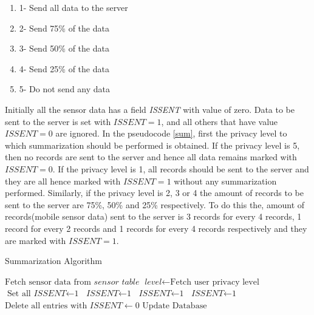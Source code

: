 \begin{enumerate}
	\item 1- Send all data to the server
	\item 2- Send 75\% of the data
    \item 3- Send 50\% of the data
    \item 4- Send 25\% of the data
    \item 5- Do not send any data
\end{enumerate}

Initially all the sensor data has a field \textit{ISSENT} with value of zero. Data to be sent to the server is set with $\textit{ISSENT}=1$, and all others that have value $\textit{ISSENT}=0$ are ignored. In the pseudocode \ref{sum}, first the privacy level to which summarization should be performed is obtained. If the privacy level is 5, then no records are sent to the server and hence all data remains marked with $\textit{ISSENT}=0$. If the privacy level is 1, all records should be sent to the server and they are all hence marked with $\textit{ISSENT}=1$ without any summarization performed. Similarly, if the privacy level is 2, 3 or 4 the amount of records to be sent to the server are 75\%, 50\% and 25\% respectively. To do this the, amount of records(mobile sensor data) sent to the server is 3 records for every 4 records, 1 record for every 2 records and 1 records for every 4 records respectively and they are marked with $\textit{ISSENT}=1$.

\begin{algorithm}
\caption{Summarization Algorithm}\label{sum}
\begin{algorithmic}[1]
\State $\text{Fetch sensor data from } \textit{sensor table}$
\State $\textit{level} \gets \text{Fetch user privacy level}$
  \State $\text{Set all } \textit{ISSENT} \gets \text{1}$
 	 \State $\textit{ISSENT} \gets \text{1}$
 	\EndFor 
{}
 	 \State $\textit{ISSENT} \gets \text{1}$
 	\EndFor
{}
 	 \State $\textit{ISSENT} \gets \text{1}$
 	\EndFor
\EndIf
\State $\text{Delete all entries with } \textit{ISSENT} \gets 0$
\State $\text{Update Database}$
\EndFor
\EndProcedure
\end{algorithmic}
\end{algorithm}

